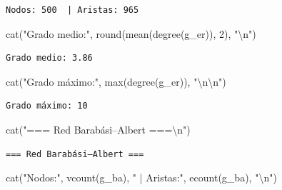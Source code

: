 \documentclass[
  letterpaper,
  DIV=11,
  numbers=noendperiod]{scrreprt}
\newenvironment{Shaded}{\begin{snugshade}}{\end{snugshade}}
\newcommand{\DecValTok}[1]{\textcolor[rgb]{0.68,0.00,0.00}{#1}}
\newcommand{\FunctionTok}[1]{\textcolor[rgb]{0.28,0.35,0.67}{#1}}
\newcommand{\NormalTok}[1]{\textcolor[rgb]{0.00,0.23,0.31}{#1}}
\newcommand{\SpecialCharTok}[1]{\textcolor[rgb]{0.37,0.37,0.37}{#1}}
\newcommand{\StringTok}[1]{\textcolor[rgb]{0.13,0.47,0.30}{#1}}
\begin{document}
\begin{verbatim}
Nodos: 500  | Aristas: 965 
\end{verbatim}

\begin{Shaded}
\begin{Highlighting}[]
\FunctionTok{cat}\NormalTok{(}\StringTok{"Grado medio:"}\NormalTok{, }\FunctionTok{round}\NormalTok{(}\FunctionTok{mean}\NormalTok{(}\FunctionTok{degree}\NormalTok{(g\_er)), }\DecValTok{2}\NormalTok{), }\StringTok{"}\SpecialCharTok{\textbackslash{}n}\StringTok{"}\NormalTok{)}
\end{Highlighting}
\end{Shaded}

\begin{verbatim}
Grado medio: 3.86 
\end{verbatim}

\begin{Shaded}
\begin{Highlighting}[]
\FunctionTok{cat}\NormalTok{(}\StringTok{"Grado máximo:"}\NormalTok{, }\FunctionTok{max}\NormalTok{(}\FunctionTok{degree}\NormalTok{(g\_er)), }\StringTok{"}\SpecialCharTok{\textbackslash{}n\textbackslash{}n}\StringTok{"}\NormalTok{)}
\end{Highlighting}
\end{Shaded}

\begin{verbatim}
Grado máximo: 10 
\end{verbatim}

\begin{Shaded}
\begin{Highlighting}[]
\FunctionTok{cat}\NormalTok{(}\StringTok{"=== Red Barabási–Albert ===}\SpecialCharTok{\textbackslash{}n}\StringTok{"}\NormalTok{)}
\end{Highlighting}
\end{Shaded}

\begin{verbatim}
=== Red Barabási–Albert ===
\end{verbatim}

\begin{Shaded}
\begin{Highlighting}[]
\FunctionTok{cat}\NormalTok{(}\StringTok{"Nodos:"}\NormalTok{, }\FunctionTok{vcount}\NormalTok{(g\_ba), }\StringTok{" | Aristas:"}\NormalTok{, }\FunctionTok{ecount}\NormalTok{(g\_ba), }\StringTok{"}\SpecialCharTok{\textbackslash{}n}\StringTok{"}\NormalTok{)}
\end{Highlighting}
\end{Shaded}
\end{document}
